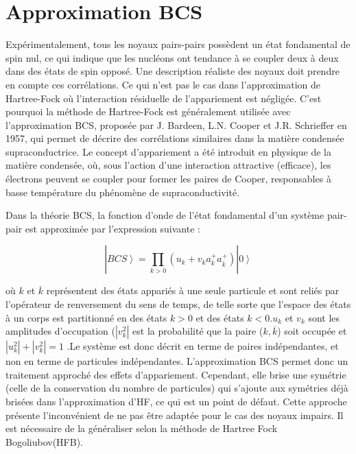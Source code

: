 \section{Approximation BCS}

Expérimentalement, tous les noyaux pairs-pairs possèdent un état fondamental de spin nul, ce qui indique que les nucléons ont tendance à se coupler deux à deux dans des états de spin opposé. Une description réaliste des noyaux doit prendre en compte ces corrélations. Ce qui n’est pas le cas dans l’approximation de Hartree-Fock où l’interaction résiduelle de l’appariement est négligée. C’est pourquoi la méthode de Hartree-Fock est généralement utilisée avec l’approximation BCS, proposée par J. Bardeen, L.N. Cooper et J.R. Schrieffer en 1957, qui permet de décrire des corrélations similaires dans la matière condensée supraconductrice. Le concept d’appariement a été introduit en physique de la matière condensée, où, sous l’action d’une interaction attractive (efficace), les électrons peuvent se coupler pour former les paires de Cooper, responsables à basse température du phénomène de supraconductivité. 

Dans la théorie BCS, la fonction d’onde de l’état fondamental d’un système pair-pair est approximée par l’expression suivante :   

\begin{equation}|\left.BCS\right\rangle
=\prod _{k>0}\left(u_k+v_k a_k^{+} a_{\overline k}^{+}\right) | \left.0\right\rangle
\end{equation}


où $k$ et $\overline k$ représentent des états appariés à une seule particule et sont reliés par l’opérateur de renversement du sens de temps, de telle sorte que l’espace des états à un corps est partitionné en des états $k > 0$ et des états  $k< 0.u_k$ et $v_k$ sont les amplitudes d’occupation ($|v^2_k|$ est la probabilité que la paire ($k , \overline k$) soit occupée et$\left|\left.u_k^2\right|+\left|v_k^2\right.\right|=1$ .Le système est donc décrit en terme de paires indépendantes, et non en terme de particules indépendantes. 
L’approximation BCS permet donc un traitement approché des effets d’appariement. Cependant, elle brise une symétrie (celle de la conservation du nombre de particules) qui s’ajoute aux symétries déjà brisées dans l’approximation d’HF, ce qui est un point de défaut. Cette approche présente l’inconvénient de ne pas être adaptée pour le cas des noyaux impairs. Il est nécessaire de la généraliser selon la méthode de Hartree Fock Bogoliubov(HFB).

